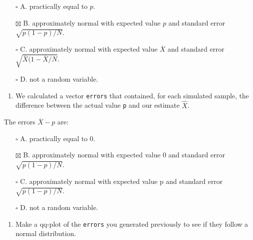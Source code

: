 \documentclass[
]{article}
\providecommand{\tightlist}{%
  \setlength{\itemsep}{0pt}\setlength{\parskip}{0pt}}
\begin{document}
\begin{itemize}
\tightlist
\item[$\square$]
  A. practically equal to \(p\).
\item[$\boxtimes$]
  B. approximately normal with expected value \(p\) and standard error
  \(\sqrt{p(1 − p)/N}\).
\item[$\square$]
  C. approximately normal with expected value \(\overline{X}\) and
  standard error \(\sqrt{\overline{X}(1 − \overline{X}/N}\).
\item[$\square$]
  D. not a random variable.
\end{itemize}

\begin{enumerate}
\def\labelenumi{\arabic{enumi}.}
\setcounter{enumi}{9}
\tightlist
\item
  We calculated a vector \texttt{errors} that contained, for each
  simulated sample, the difference between the actual value \texttt{p}
  and our estimate \(\hat{X}\).
\end{enumerate}

The errors \(\overline{X} − p\) are:

\begin{itemize}
\tightlist
\item[$\square$]
  A. practically equal to 0.
\item[$\boxtimes$]
  B. approximately normal with expected value 0 and standard error
  \(\sqrt{p(1 − p)/N}\).
\item[$\square$]
  C. approximately normal with expected value p and standard error
  \(\sqrt{p(1 − p)/N}\).
\item[$\square$]
  D. not a random variable.
\end{itemize}

\begin{enumerate}
\def\labelenumi{\arabic{enumi}.}
\setcounter{enumi}{10}
\tightlist
\item
  Make a qq-plot of the \texttt{errors} you generated previously to see
  if they follow a normal distribution.
\end{enumerate}
\end{document}
